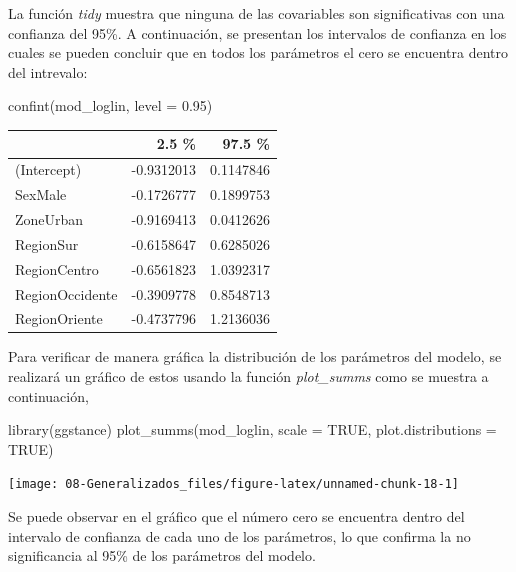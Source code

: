 \documentclass[
  12pt,
]{book}
\newenvironment{Shaded}{\begin{snugshade}}{\end{snugshade}}
\newcommand{\AttributeTok}[1]{\textcolor[rgb]{0.77,0.63,0.00}{#1}}
\newcommand{\ConstantTok}[1]{\textcolor[rgb]{0.00,0.00,0.00}{#1}}
\newcommand{\FloatTok}[1]{\textcolor[rgb]{0.00,0.00,0.81}{#1}}
\newcommand{\FunctionTok}[1]{\textcolor[rgb]{0.00,0.00,0.00}{#1}}
\newcommand{\NormalTok}[1]{#1}
\begin{document}
La función \emph{tidy} muestra que ninguna de las covariables son significativas con una confianza del 95\%. A continuación, se presentan los intervalos de confianza en los cuales se pueden concluir que en todos los parámetros el cero se encuentra dentro del intrevalo:

\begin{Shaded}
\begin{Highlighting}[]
\FunctionTok{confint}\NormalTok{(mod\_loglin, }\AttributeTok{level =} \FloatTok{0.95}\NormalTok{) }
\end{Highlighting}
\end{Shaded}

\begin{tabular}{l|r|r}
\hline
  & 2.5 \% & 97.5 \%\\
\hline
(Intercept) & -0.9312013 & 0.1147846\\
\hline
SexMale & -0.1726777 & 0.1899753\\
\hline
ZoneUrban & -0.9169413 & 0.0412626\\
\hline
RegionSur & -0.6158647 & 0.6285026\\
\hline
RegionCentro & -0.6561823 & 1.0392317\\
\hline
RegionOccidente & -0.3909778 & 0.8548713\\
\hline
RegionOriente & -0.4737796 & 1.2136036\\
\hline
\end{tabular}

Para verificar de manera gráfica la distribución de los parámetros del modelo, se realizará un gráfico de estos usando la función \emph{plot\_summs} como se muestra a continuación,

\begin{Shaded}
\begin{Highlighting}[]
\FunctionTok{library}\NormalTok{(ggstance)}
\FunctionTok{plot\_summs}\NormalTok{(mod\_loglin, }
             \AttributeTok{scale =} \ConstantTok{TRUE}\NormalTok{, }\AttributeTok{plot.distributions =} \ConstantTok{TRUE}\NormalTok{)}
\end{Highlighting}
\end{Shaded}

\texttt{[image: 08-Generalizados\_files/figure-latex/unnamed-chunk-18-1]}

Se puede observar en el gráfico que el número cero se encuentra dentro del intervalo de confianza de cada uno de los parámetros, lo que confirma la no significancia al 95\% de los parámetros del modelo.
\end{document}
